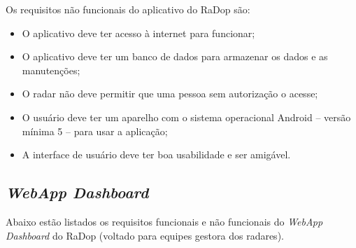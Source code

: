 Os requisitos não funcionais do aplicativo do RaDop são:

\begin{itemize}
    \item O aplicativo deve ter acesso à internet para funcionar;
    \item O aplicativo deve ter um banco de dados para armazenar os dados e as manutenções;
    \item O radar não deve permitir que uma pessoa sem autorização o acesse;
    \item O usuário deve ter um aparelho com o sistema operacional Android -- versão mínima 5 -- para usar a aplicação;
    \item A interface de usuário deve ter boa usabilidade e ser amigável.
\end{itemize}

\subsection{\textit{WebApp Dashboard}}

Abaixo estão listados os requisitos funcionais e não funcionais do \textit{WebApp Dashboard} do RaDop (voltado para equipes gestora dos radares).

